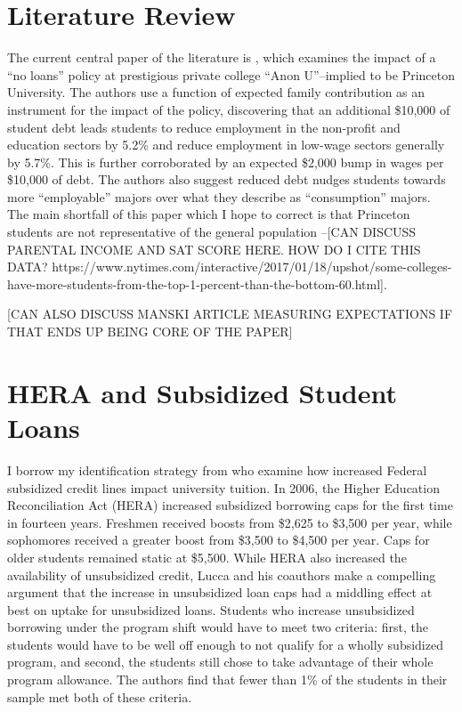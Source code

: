 \documentclass{article}
\begin{document}
	\section{Literature Review}
	
	The current central paper of the literature is \textcite{rothstein2011}, which examines the impact of a ``no loans'' policy at prestigious private college ``Anon U''--implied to be Princeton University. The authors use a function of expected family contribution as an instrument for the impact of the policy, discovering that an additional \$10,000 of student debt leads students to reduce employment in the non-profit and education sectors by 5.2\% and reduce employment in low-wage sectors generally by 5.7\%. This is further corroborated by an expected \$2,000 bump in wages per \$10,000 of debt. The authors also suggest reduced debt nudges students towards more ``employable'' majors over what they describe as ``consumption'' majors. The main shortfall of this paper which I hope to correct is that Princeton students are not representative of the general population --[CAN DISCUSS PARENTAL INCOME AND SAT SCORE HERE. HOW DO I CITE THIS DATA? https://www.nytimes.com/interactive/2017/01/18/upshot/some-colleges-have-more-students-from-the-top-1-percent-than-the-bottom-60.html]. 
	
	[CAN ALSO DISCUSS MANSKI ARTICLE MEASURING EXPECTATIONS IF THAT ENDS UP BEING CORE OF THE PAPER]
	
	\section{HERA and Subsidized Student Loans}
	
	I borrow my identification strategy from \textcite{lucca2018} who examine how increased Federal subsidized credit lines impact university tuition. In 2006, the Higher Education Reconciliation Act (HERA) increased subsidized borrowing caps for the first time in fourteen years. Freshmen received boosts from \$2,625 to \$3,500 per year, while sophomores received a greater boost from \$3,500 to \$4,500 per year. Caps for older students remained static at \$5,500. While HERA also increased the availability of unsubsidized credit, Lucca and his coauthors make a compelling argument that the increase in unsubsidized loan caps had a middling effect at best on uptake for unsubsidized loans. Students who increase unsubsidized borrowing under the program shift would have to meet two criteria: first, the students would have to be well off enough to not qualify for a wholly subsidized program, and second, the students still chose to take advantage of their whole program allowance. The authors find that fewer than 1\% of the students in their sample met both of these criteria.
	
\end{document}
